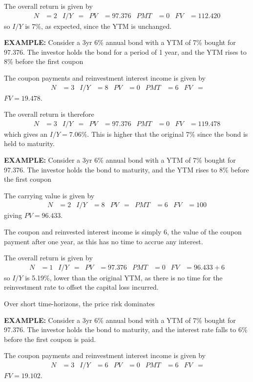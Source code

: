 \documentclass[../notes_compiled.tex]{subfiles}
\begin{document}
\begin{itemize}
{The overall return is given by
\begin{align*}
N&=2  & I / Y &= & PV &=97.376 & PMT &=0 & FV &=112.420
\end{align*}
so $I / Y$ is 7\%, as expected, since the YTM is unchanged.
\item[]
}
{\color{RedViolet}
\item[] \textbf{EXAMPLE:} Consider a 3yr 6\% annual bond with a YTM of 7\% bought for 97.376. The investor holds the bond for a period of 1 year, and the YTM rises to 8\% before the first coupon
}


{\color{RoyalBlue}
The coupon payments and reinvestment interest income is given by
\begin{align*}
N&=3  & I / Y &= 8 & PV &=0 & PMT &=6 & FV &=
\end{align*}
$FV=19.478$. 

The overall return is therefore
\begin{align*}
N&=3  & I / Y &=  & PV &=97.376 & PMT &=0 & FV &=119.478
\end{align*}
which gives an $I / Y=7.06\%$. This is higher that the original 7\% since the bond is held to maturity.
\item[]
}
{\color{RedViolet}
\item[] \textbf{EXAMPLE:} Consider a 3yr 6\% annual bond with a YTM of 7\% bought for 97.376. The investor holds the bond to maturity, and the YTM rises to 8\% before the first coupon
}
{\color{RoyalBlue}


The carrying value is given by 
\begin{align*}
N&=2  & I / Y &= 8 & PV &= & PMT &=6 & FV &=100
\end{align*}
giving $PV=96.433$.

The coupon and reinvested interest income is simply 6, the value of the coupon payment after one year, as this has no time to accrue any interest.

The overall return is given by
\begin{align*}
N&=1  & I / Y &= & PV &=97.376 & PMT &=0 & FV &=96.433 + 6
\end{align*}
so $I / Y$ is 5.19\%, lower than the original YTM, as there is no time for the reinvestment rate to offset the capital loss incurred.
}
\item[]Over short time-horizons, the price risk dominates
\item[]

{\color{RedViolet}
\item[] \textbf{EXAMPLE:} Consider a 3yr 6\% annual bond with a YTM of 7\% bought for 97.376. The investor holds the bond to maturity, and the interest rate falls to 6\% before the first coupon is paid.
}
{\color{RoyalBlue}
The coupon payments and reinvestment interest income is given by
\begin{align*}
N&=3  & I / Y &= 6 & PV &=0 & PMT &=6 & FV &=
\end{align*}
$FV=19.102$. 

}
\end{itemize}
\end{document}

